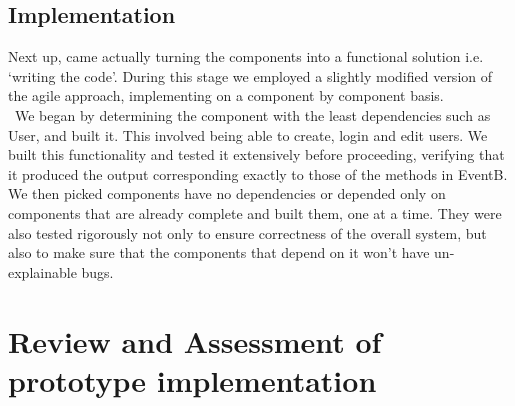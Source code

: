 \documentclass[a4paper]{article}
\begin{document}
\subsection{Implementation}

Next up, came actually turning the components into a functional solution i.e. ‘writing the code’. During this stage we employed a slightly modified version of the agile approach, implementing on a component by component basis.
\\\
We began by determining the component with the least dependencies such as User, and built it. This involved being able to create, login and edit users. We built this functionality and tested it extensively before proceeding, verifying that it produced the output corresponding exactly to those of the methods in EventB.
We then picked components have no dependencies or depended only on components that are already complete and built them, one at a time. They were also tested rigorously not only to ensure correctness of the overall system, but also to make sure that the components that depend on it won’t have un-explainable bugs. 

\pagebreak
\section{Review and Assessment of prototype implementation}
\pagebreak
\end{document}
